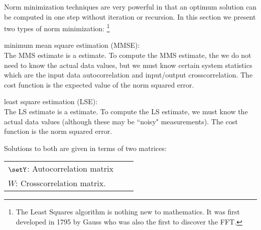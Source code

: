 Norm minimization techniques are very powerful
in that an optimum solution can be computed
in one step without iteration or recursion.
In this section we present two types of norm minimization:
\footnote{
   The Least Squares algorithm is nothing new to mathematics.
   It was first developed in 1795 by Gauss who was also the first
   to discover the FFT.
   }

\begin{enume}
  \item minimum mean square estimation (MMSE): \\
        The MMS estimate is a  estimate.
        To compute the MMS estimate, the we do not need to know
        the actual data values, but we must know certain system statistics
        which are the
        input data autocorrelation and input/output crosscorrelation.
        The cost function is the expected value of the norm squared error.
   \item least square estimation (LSE): \\
        The LS estimate is a  estimate.
        To compute the LS estimate, we must know the actual data values
        (although these may be ``noisy" measurements).
        The cost function is the norm squared error.
\end{enume}

Solutions to both are given in terms of two matrices:

\begin{tabular}{lll}
   $\setY$: Autocorrelation matrix \\
   $W$: Crosscorrelation matrix.
\end{tabular}

